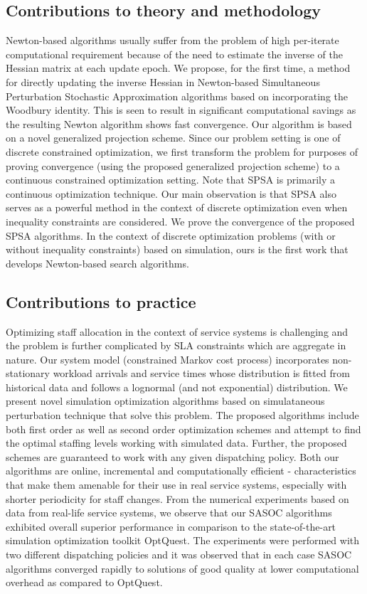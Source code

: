 \documentclass[11pt,letterpaper,english]{article}
\begin{document}
\subsection{Contributions to theory and methodology}
Newton-based algorithms usually suffer from the problem
of high per-iterate computational requirement because of
the need to estimate the inverse of the Hessian matrix at
each update epoch. We propose, for the first time, a method
for directly updating the inverse Hessian in Newton-based
Simultaneous Perturbation Stochastic Approximation algorithms
based on incorporating the Woodbury identity. This is seen to
result in significant computational savings as the resulting
Newton algorithm shows fast convergence. Our algorithm is based
on a novel generalized projection scheme. Since our problem
setting is one of discrete constrained optimization, we first
transform the problem for purposes of proving convergence (using the
proposed generalized projection scheme) to a continuous constrained
optimization setting. Note that SPSA is primarily a continuous
optimization technique. Our main observation is that SPSA also serves as a
powerful method in the context of discrete optimization even when
inequality constraints are considered. We prove the convergence
of the proposed SPSA algorithms. In the context of discrete optimization problems (with or
without inequality constraints) based on simulation, ours
is the first work that develops Newton-based
search algorithms.

\subsection{Contributions to practice}
Optimizing staff allocation in the context of service systems is challenging and the problem is further complicated by SLA constraints which are aggregate in nature.  Our system model (constrained Markov cost process) incorporates non-stationary workload arrivals and service times whose distribution is fitted from historical data and follows a lognormal (and not exponential) distribution. We present novel simulation optimization algorithms based on simulataneous perturbation technique that solve this problem. The proposed algorithms include both first order as well as second order optimization schemes and attempt to find the optimal staffing levels working with simulated data. Further, the proposed schemes are guaranteed to work with any given dispatching policy. Both our algorithms are online, incremental and computationally efficient - characteristics that make them amenable for their use in real service systems, especially with shorter periodicity for staff changes. From the numerical experiments based on 
data from real-life service systems, we observe that our SASOC algorithms exhibited overall superior performance in comparison to the state-of-the-art simulation optimization toolkit OptQuest. The experiments were performed with two different dispatching policies and it was observed that in each case SASOC algorithms converged rapidly to solutions of good quality at lower computational overhead as compared to OptQuest.        
 
\end{document}
